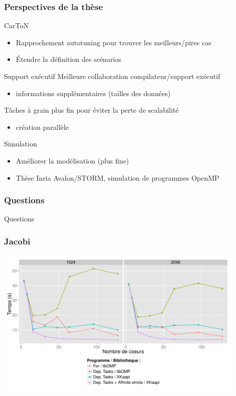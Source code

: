 \documentclass[xcolor={usenames,dvipsnames,svgnames,table}, aspectratio=43]{beamer}
\begin{document}
\begin{frame}
  \frametitle{Perspectives de la thèse}
  \begin{block}{CarToN}
    \begin{itemize}
      \item Rapprochement autotuning pour trouver les meilleurs/pires cas
      \item Étendre la définition des scénarios
    \end{itemize}
  \end{block}

  \begin{block}{Support exécutif}
    Meilleure collaboration compilateur/support exécutif
    \begin{itemize}
      \item informations supplémentaires (tailles des données)
    \end{itemize}
    Tâches à grain plus fin pour éviter la perte de scalabilité
    \begin{itemize}
      \item création parallèle
    \end{itemize}
  \end{block}

  \begin{block}{Simulation}
    \begin{itemize}
      \item Améliorer la modélisation (plus fine)
      \item Thèse Inria Avalon/STORM, simulation de programmes OpenMP
    \end{itemize}
  \end{block}
\end{frame}

\begin{frame}
  \frametitle{Questions}

  Questions

\end{frame}

\appendix

\begin{frame}
  \frametitle{Jacobi}

  \includegraphics[width=0.9\textwidth]{graph/jacobi_scale_iomp_komp.pdf}

\end{frame}
\end{document}
